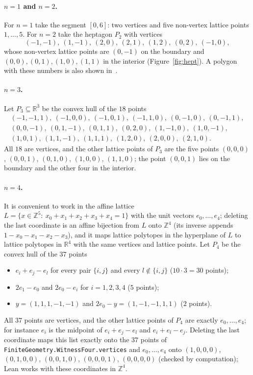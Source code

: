 \documentclass[11pt]{article}
\theoremstyle{definition}
\theoremstyle{remark}
\newcommand{\Z}{\mathbb Z}
\newcommand{\R}{\mathbb R}
\begin{document}
\paragraph{$n=1$ and $n=2$.} For $n=1$ take the segment $[0,6]$: two vertices
and five non-vertex lattice points $1,\dots,5$. For $n=2$ take the heptagon
$P_2$ with vertices
\[
(-1,-1),\ (1,-1),\ (2,0),\ (2,1),\ (1,2),\ (0,2),\ (-1,0),
\]
whose non-vertex lattice points are $(0,-1)$ on the boundary and
$(0,0),(0,1),(1,0),(1,1)$ in the interior (Figure~\ref{fig:hept}). A polygon with these numbers is also shown
in~\cite[Figure~1]{chz}.


\paragraph{$n=3$.} Let $P_3\subseteq\R^3$ be the convex hull of the $18$ points
\begin{gather*}
(-1,-1,1),\ (-1,0,0),\ (-1,0,1),\ (-1,1,0),\ (0,-1,0),\ (0,-1,1),\\
(0,0,-1),\ (0,1,-1),\ (0,1,1),\ (0,2,0),\ (1,-1,0),\ (1,0,-1),\\
(1,0,1),\ (1,1,-1),\ (1,1,1),\ (1,2,0),\ (2,0,0),\ (2,1,0).
\end{gather*}
All $18$ are vertices, and the other lattice points of $P_3$ are the five
points $(0,0,0)$, $(0,0,1)$, $(0,1,0)$, $(1,0,0)$, $(1,1,0)$; the point
$(0,0,1)$ lies on the boundary and the other four in the interior.

\paragraph{$n=4$.} It is convenient to work in the affine lattice
$L=\{x\in\Z^5:\ x_0+x_1+x_2+x_3+x_4=1\}$ with the unit vectors
$e_0,\dots,e_4$; deleting the last coordinate is an affine bijection from $L$
onto $\Z^4$ (its inverse appends $1-x_0-x_1-x_2-x_3$), and it maps lattice
polytopes in the hyperplane of $L$ to lattice polytopes in $\R^4$ with the same
vertices and lattice points. Let $P_4$ be the convex hull of the $37$ points
\begin{itemize}
\item $e_i+e_j-e_l$ for every pair $\{i,j\}$ and every $l\notin\{i,j\}$
($10\cdot3=30$ points);
\item $2e_1-e_0$ and $2e_0-e_i$ for $i=1,2,3,4$ ($5$ points);
\item $y=(1,1,1,-1,-1)$ and $2e_0-y=(1,-1,-1,1,1)$ ($2$ points).
\end{itemize}
All $37$ points are vertices, and the other lattice points of $P_4$ are exactly
$e_0,\dots,e_4$; for instance $e_i$ is the midpoint of $e_i+e_j-e_l$ and
$e_i+e_l-e_j$. Deleting the last coordinate maps this list exactly onto the
$37$ points of \texttt{FiniteGeometry.WitnessFour.vertices} and $e_0,\dots,e_4$ onto
$(1,0,0,0)$, $(0,1,0,0)$, $(0,0,1,0)$, $(0,0,0,1)$, $(0,0,0,0)$ (checked by
computation); Lean works with these coordinates in $\Z^4$.
\end{document}
